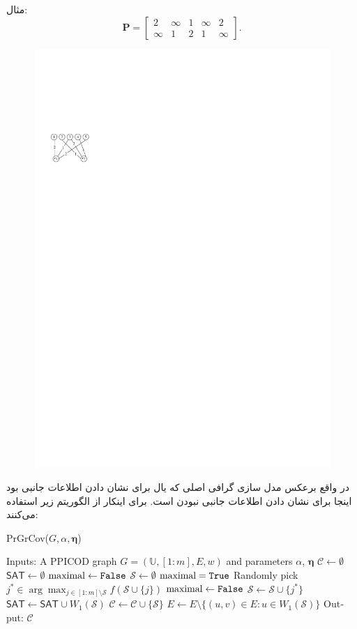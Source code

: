 مثال:
\begin{equation}
	\boldsymbol{P} = 
	\begin{bmatrix}
		2 & \infty & 1 &\infty & 2\\
		\infty & 1 & 2 & 1 & \infty \label{eq:ppicod-instance}
	\end{bmatrix}.
\end{equation}
\begin{figure}[H]
	\centering
	\includegraphics[width=0.2\linewidth]{figs/chapter4/ppgraph.pdf}
	\caption{}
	\label{fig:ppgraph}
\end{figure}
در واقع برعکس مدل سازی گرافی اصلی که یال برای نشان دادن اطلاعات جانبی بود اینجا برای نشان دادن اطلاعات جانبی نبودن است.
برای اینکار از الگوریتم زیر استفاده می‌کنند:
\begin{latin}

\begin{algorithm}[H]
	\caption{PrGrCov($G,\alpha,\boldsymbol{\eta}$)}\label{alg:pr-grcov}
	\begin{algorithmic}[1]
		\State Inputs: A PPICOD graph $G=(\mathbb{U}, [1:m], E, w)$ and parameters $\alpha$, $\boldsymbol{\eta}$
		\State $\mathcal{C} \gets \emptyset$
		\State $\mathsf{SAT} \gets \emptyset$ 
		\State $\textrm{maximal} \gets \texttt{False}$
		\State $\mathcal{S} \gets \emptyset$
		\State $\textrm{maximal} = \texttt{True}$
		\State Randomly pick $j^* \in \arg \max_{j \in [1:m] \setminus \mathcal{S}} f(\mathcal{S} \cup \{j\})$
		\State $\textrm{maximal} \gets \texttt{False}$
		\State $\mathcal{S} \gets \mathcal{S} \cup \{j^*\}$
		\EndIf
		\EndWhile
		\State $\mathsf{SAT} \gets \mathsf{SAT} \cup W_1(\mathcal{S})$
		\State $\mathcal{C} \gets \mathcal{C} \cup \{\mathcal{S}\}$
		\State $E \gets E \setminus \{ (u,v) \in E: u \in W_1(\mathcal{S})\}$
		\EndWhile
		\State Output: $\mathcal{C}$
	\end{algorithmic}
\end{algorithm}
\end{latin}

